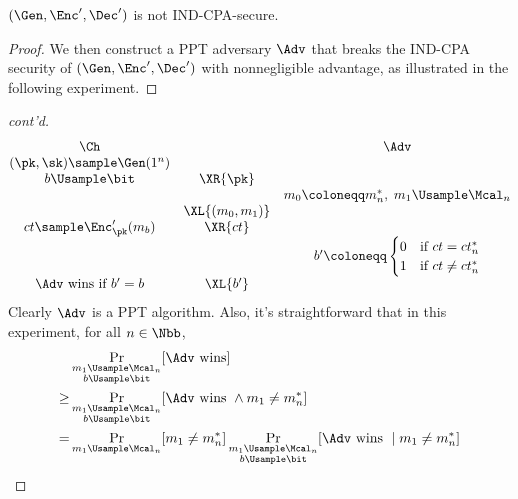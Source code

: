 \begin{answer}[iv]
    \begin{claim}
        $(\Gen, \Enc', \Dec')$ is not IND-CPA-secure.
    \end{claim}
    \begin{proof}
        We then construct a PPT adversary $\Adv$ that breaks the IND-CPA security of $(\Gen, \Enc', \Dec')$ with nonnegligible advantage, as illustrated in the following experiment.
        \end{proof}\begin{proof}[cont'd]
        {
            \[
                \begin{array}{@{} c c c@{}}
                \Ch & &  \Adv \\
                (\pk, \sk)\sample \Gen(1^n) & &   \\
                b\Usample\bit & \XR{\pk} & \\
                && m_0\coloneqq m^\ast_n,\; m_1\Usample\Mcal_n \\
                & \XL{(m_0, m_1)} & \\
                ct\sample \Enc'_{\pk}(m_b)  & \XR{ct}& \\
                && b'\coloneqq \begin{cases}
                    0 &\textrm{if } ct={ct}^\ast_n\\
                    1 &\textrm{if } ct\neq {ct}^\ast_n\\
                \end{cases}\\
                \text{$\Adv$ wins if $b' = b$} & \XL{b'} &  \\
                \end{array}
            \]
            \label{fig:p3-game2}
        }
        Clearly  $\Adv$ is a PPT algorithm. Also, it's straightforward that in this experiment, for all $n\in\Nbb$,
        \begin{align*}
            &\Pr_{\substack{m_1\Usample \Mcal_n\\b\Usample\bit}}[\Adv \textrm{ wins}]\\
            \ge& \Pr_{\substack{m_1\Usample \Mcal_n\\b\Usample\bit}}[\Adv \textrm{ wins } \land m_1\neq m^\ast_n]\\
            =& \Pr_{m_1\Usample \Mcal_n}[m_1\neq m^\ast_n] \Pr_{\substack{m_1\Usample \Mcal_n\\b\Usample\bit}}[\Adv \textrm{ wins } \mid m_1\neq m^\ast_n]\\

\end{align*}
\end{proof}
\end{answer}
